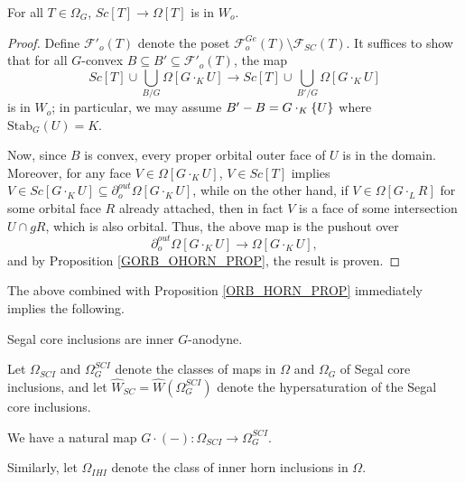 \documentclass[a4paper,10pt,draft]{article}%
\begin{document}
\begin{proposition}
      \label{SC_IN_OHORN_PROP}
      For all $T \in \Omega_G$, $Sc[T] \to \Omega[T]$ is in $W_o$. 
\end{proposition}
\begin{proof}
      Define $\mathscr{F}'_{o}(T)$ denote the poset %
      $\mathscr{F}_{o}^{G e}(T) \setminus \mathscr{F}_{SC}(T)$.
      It suffices to show that for all $G$-convex $B \subseteq B' \subseteq \mathscr{F}'_o(T)$, the map
      \begin{equation}
            Sc[T] \cup \mathop{\bigcup}\limits_{B/G}\Omega[G \cdot_K U]
            \to
            Sc[T] \cup \mathop{\bigcup}\limits_{B'/G}\Omega[G \cdot_K U]
      \end{equation}
      is in $W_o$; in particular, we may assume $B' - B = G \cdot_K \left\{U\right\}$ where $\mathrm{Stab}_G(U) = K$.

      Now, since $B$ is convex, every proper orbital outer face of $U$ is in the domain.
      Moreover, for any face $V \in \Omega[G \cdot_K U]$,
      $V \in Sc[T]$ implies
      $V \in Sc[G \cdot_K U] \subseteq \partial^{out}_o\Omega[G \cdot_K U]$,
      while on the other hand,
      if $V \in \Omega[G \cdot_L R]$ for some orbital face $R$ already attached,
      then in fact $V$ is a face of some intersection $U \cap g R$,
      which is also orbital.
      Thus, the above map is the pushout over
      \begin{equation}
            \partial^{out}_o\Omega[G \cdot_K U] \to \Omega[G \cdot_K U],
      \end{equation}
      and by Proposition \ref{GORB_OHORN_PROP}, the result is proven.
\end{proof}

The above combined with Proposition \ref{ORB_HORN_PROP} immediately implies the following.
\begin{corollary}
      Segal core inclusions are inner $G$-anodyne.
\end{corollary}


\begin{notation}
      Let $\Omega_{SCI}$ and $\Omega^{SCI}_G$ denote the classes of maps in $\Omega$ and $\Omega_G$
      of Segal core inclusions,
      and let $\hat{W}_{SC} = \hat{W}(\Omega^{SCI}_G)$ denote the hypersaturation of the Segal core inclusions.

      We have a natural map $G \cdot (-): \Omega_{SCI} \to \Omega^{SCI}_G$.

      Similarly, let $\Omega_{IHI}$ denote the class of inner horn inclusions in $\Omega$.      
\end{notation}
\end{document}
